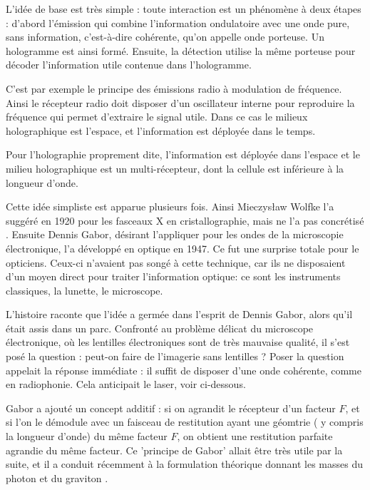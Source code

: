 \documentclass[a4paper,12pt]{article}
\begin{document}
L'idée de base est très simple : toute interaction est un phénomène à deux étapes : d'abord l'émission qui combine l'information ondulatoire avec une onde pure, sans information, c'est-à-dire cohérente, qu'on appelle onde porteuse. Un hologramme est ainsi formé. Ensuite, la détection utilise la même porteuse pour décoder l'information utile contenue dans l'hologramme.


C'est par exemple le principe des émissions radio à modulation de fréquence. Ainsi le récepteur radio doit disposer d'un oscillateur interne pour reproduire la fréquence qui permet d'extraire le signal utile. Dans ce cas le milieux holographique est l'espace, et l'information est déployée dans le temps.


Pour l'holographie proprement dite, l'information est déployée dans l'espace et le milieu holographique est un multi-récepteur, dont la cellule est inférieure à la longueur d'onde.


Cette idée simpliste est apparue plusieurs fois. Ainsi Mieczysław Wolfke l'a suggéré en 1920 pour les fasceaux X en cristallographie, mais ne l'a pas concrétisé \cite{Gabor}. Ensuite Dennis Gabor, désirant l'appliquer pour les ondes de la microscopie électronique, l'a développé en optique en 1947. Ce fut une surprise totale pour le opticiens. Ceux-ci n'avaient pas songé à cette technique, car ils ne disposaient d'un moyen direct pour traiter l'information optique: ce sont les instruments classiques, la lunette, le microscope.



L'histoire raconte que l'idée a germée dans l'esprit de Dennis Gabor, alors qu'il était assis dans un parc. Confronté au problème délicat du microscope électronique, où les lentilles électroniques sont de très mauvaise qualité, il s'est posé la question : peut-on faire de l'imagerie sans lentilles ? Poser la question appelait la réponse immédiate : il suffit de disposer d'une onde cohérente, comme en radiophonie. Cela anticipait le laser, voir ci-dessous.


Gabor a ajouté un concept additif : si on agrandit le récepteur d'un facteur $F$, et si l'on le démodule avec un faisceau de restitution ayant une géomtrie ( y compris la longueur d'onde) du même facteur $F$, on obtient une restitution parfaite agrandie du même facteur. Ce 'principe de Gabor' allait être très utile par la suite, et il a conduit récemment à la formulation théorique donnant les masses du photon et du graviton \cite{Sanchez}.
\end{document}
